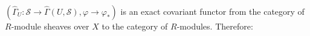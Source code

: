 $(\hat{\Gamma}_U: \mathcal{S} \rightarrow \hat{\Gamma}(U, \mathcal{S}), \varphi \rightarrow \varphi_*)$ is an exact covariant functor from the category of $R$-module sheaves over $X$ to the category of $R$-modules. Therefore:
